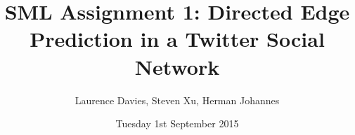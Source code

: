 \documentclass[11pt]{article}
\begin{document}
\title{SML Assignment 1: Directed Edge Prediction in a Twitter Social Network}
\author{Laurence Davies, Steven Xu, Herman Johannes}
\date{Tuesday 1st September 2015}
\maketitle





\end{document}
